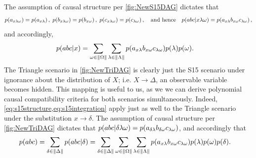The assumption of causal structure per \cref{fig:NewS15DAG} dictates that
\begin{align}\begin{split}\label{eq:s15structure}
p\lparen a_{x \lambda \omega}\rparen=p\lparen a_{x \lambda}\rparen \,,\; p\lparen b_{x \lambda \omega}\rparen=p\lparen b_{x \omega}\rparen \,,\; p\lparen c_{x \lambda \omega}\rparen=p\lparen c_{\lambda \omega}\rparen \,,\quad\text{and hence}\quad p\lparen a b c | x \lambda \omega\rparen=p\lparen a_{x \lambda} b_{x \omega} c_{\lambda \omega}\rparen\,,
\end{split}\end{align}
and accordingly, 
\begin{align}\label{eq:s15integration}
&p\lparen a b c | x\rparen=\sum\limits_{\omega\in \lVert\Omega\rVert} \sum\limits_{\lambda\in \lVert\Lambda\rVert} p\lparen a_{x \lambda} b_{x \omega} c_{\lambda \omega}\rparen p\lparen\lambda\rparen p\lparen\omega\rparen.
\end{align}
The Triangle scenario in \cref{fig:NewTriDAG} is clearly just the S15 scenario under ignorance about the distribution of $X$; i.e. $X\to \Delta$, an observable variable becomes hidden. This mapping is useful to us, as we we can derive polynomial causal compatibility criteria for both scenarios simultaneously. Indeed, \cref{eq:s15structure,eq:s15integration} apply just as well to the Triangle scenario under the substitution $x\to \delta$. 
The assumption of causal structure per \cref{fig:NewTriDAG} dictates that $p\lparen a b c | \delta \lambda \omega\rparen=p\lparen a_{\delta \lambda} b_{\delta \omega} c_{\lambda \omega}\rparen$, and accordingly that
\begin{align}\label{eq:triintegration2}
&p\lparen a b c\rparen=\sum\limits_{\delta\in \lVert\Delta\rVert}p\lparen a b c | \delta\rparen= \sum\limits_{\delta\in \lVert\Delta\rVert}\sum\limits_{\omega\in \lVert\Omega\rVert} \sum\limits_{\lambda\in \lVert\Lambda\rVert} p\lparen a_{x \lambda} b_{x \omega} c_{\lambda \omega}\rparen p\lparen\lambda\rparen p\lparen\omega\rparen p\lparen\delta\rparen.
\end{align}

